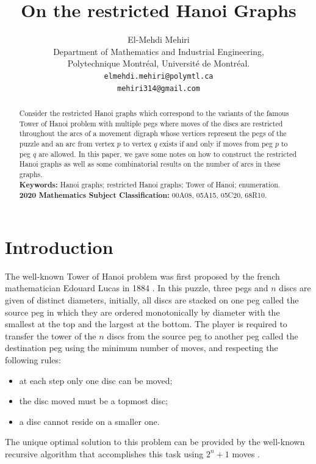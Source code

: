 \documentclass[letterpaper,11pt]{article}
\author{
 El-Mehdi Mehiri \\
  Department of Mathematics and Industrial Engineering,\\
  Polytechnique Montréal, Université de Montréal. \\
  \texttt{elmehdi.mehiri@polymtl.ca} \\
  \texttt{mehiri314@gmail.com} \\
}
\title{\textbf{On the restricted Hanoi Graphs}}
\date{}
\begin{document}
\maketitle

 \begin{abstract}
 \noindent
Consider the restricted Hanoi graphs which correspond to the variants of the famous Tower of Hanoi problem with multiple pegs where moves of the discs are restricted throughout the arcs of a movement digraph whose vertices represent the pegs of the puzzle and an arc from vertex $p$ to vertex $q$ exists if and only if moves from peg $p$ to peg $q$ are allowed. In this paper, we gave some notes on how to construct the restricted Hanoi graphs as well as some combinatorial results on the number of arcs in these graphs.
 \\[2mm]
 {\bf Keywords:} Hanoi graphs; restricted Hanoi graphs; Tower of Hanoi; enumeration.\\[2mm]
 {\bf 2020 Mathematics Subject Classification:} 00A08, 05A15, 05C20, 68R10.
 \end{abstract}

\baselineskip=0.20in



\section{Introduction}
The well-known Tower of Hanoi problem was first proposed by the french mathematician Edouard Lucas in 1884 \cite{itard1960ed}. In this puzzle, three pegs and $n$ discs are given of distinct diameters, initially, all discs are stacked on one peg called the source peg in which they are ordered monotonically by diameter with the smallest at the top and the largest at the bottom. The player is required to transfer the tower of the $n$ discs from the source peg to another peg called the destination peg using the minimum number of moves, and respecting the following rules:

\begin{itemize}
\item[$(i)$] at each step only one disc can be moved;
       \item[$(ii)$] the disc moved must be a topmost disc;
       \item[$(iii)$] a disc cannot reside on a smaller one.
\end{itemize}
The unique optimal solution to this problem can be provided by the well-known recursive algorithm that accomplishes this task using
$2^{n}+1$ moves \cite{hinz2018tower}.
\end{document}

